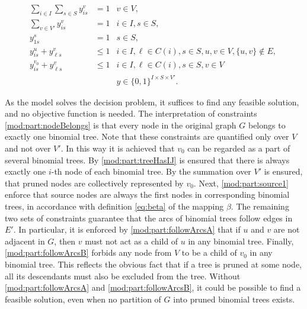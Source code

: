 \begin{subequations}\label{mod:partition}
\begin{align}
\label{mod:part:nodeBelongs} \sum\limits_{i\in I}\sum\limits_{s\in S}y^v_{is} & = 1 & v\in V,\\
\label{mod:part:treeHasIJ} \sum\limits_{v\in V'}y^v_{is} & = 1 & i\in I,s\in S,\\
\label{mod:part:source1} y_{1s}^s & = 1  & s\in S,\\
\label{mod:part:followArcsA} y^u_{is}+y^v_{\ell s} &\leq 1 & i\in I,\ell\in C(i), s\in S, u,v\in V,\{u,v\}\not\in E,\\
\label{mod:part:followArcsB} y^{v_0}_{is}+y^v_{\ell s} &\leq 1 & i\in I,\ell\in C(i), s\in S, v\in V\\
\label{mod:part:dim}&&y \in \{0,1\}^{I\times S\times V'}.
\end{align}~
\end{subequations}

As the model solves the decision problem, it suffices to find any feasible solution, and no objective function is needed.
The interpretation of constraints \eqref{mod:part:nodeBelongs} is that every node in the original graph $G$ belongs to exactly one binomial tree.
Note that these constraints are quantified only over $V$ and not over $V'$.
In this way it is achieved that $v_0$ can be regarded as a part of several binomial trees.
By \eqref{mod:part:treeHasIJ} is ensured that there is always exactly one $i$-th node of each binomial tree.
By the summation over $V'$ is ensured, that pruned nodes are collectively represented by $v_0$.
Next, \eqref{mod:part:source1} enforce that source nodes are always the first nodes in corresponding binomial trees, in accordance with definition \eqref{eq:beta} of the mapping $\beta$.
The remaining two sets of constraints guarantee that the arcs of binomial trees follow edges in $E'$.
In particular, it is enforced by \eqref{mod:part:followArcsA} that if $u$ and $v$ are not adjacent in $G$, then $v$ must not act as a child of $u$ in any binomial tree.
Finally, \eqref{mod:part:followArcsB} forbids any node from $V$ to be a child of $v_0$ in any binomial tree. 
This reflects the obvious fact that if a tree is pruned at some node, all its descendants must also be excluded from the tree.
Without \eqref{mod:part:followArcsA} and \eqref{mod:part:followArcsB}, it could be possible to find a feasible solution, even when no partition of $G$ into pruned binomial trees exists.


